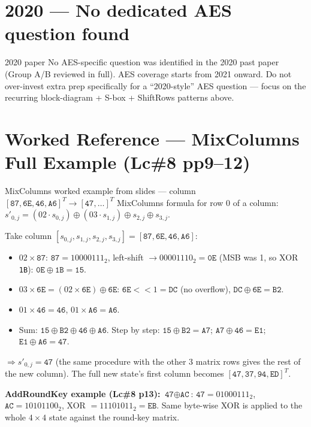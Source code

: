 \documentclass[12pt,a4paper]{article}
\begin{document}
\section*{2020 --- No dedicated AES question found}
\begin{warnbox}{2020 paper}
No AES-specific question was identified in the 2020 past paper (Group A/B reviewed in full). AES coverage starts from 2021 onward. Do not over-invest extra prep specifically for a ``2020-style'' AES question --- focus on the recurring block-diagram + S-box + ShiftRows patterns above.
\end{warnbox}

\section*{Worked Reference --- MixColumns Full Example (Lc\#8 pp9--12)}

\begin{algobox}{MixColumns worked example from slides --- column $[\texttt{87},\texttt{6E},\texttt{46},\texttt{A6}]^T \to [\texttt{47},\ldots]^T$}
MixColumns formula for row 0 of a column: $s'_{0,j}=(02\cdot s_{0,j})\oplus(03\cdot s_{1,j})\oplus s_{2,j}\oplus s_{3,j}$.

Take column $[s_{0,j},s_{1,j},s_{2,j},s_{3,j}]=[\texttt{87},\texttt{6E},\texttt{46},\texttt{A6}]$:
\begin{itemize}[noitemsep]
  \item $02\times\texttt{87}$: $\texttt{87}=10000111_2$, left-shift $\to 00001110_2=\texttt{0E}$ (MSB was 1, so XOR \texttt{1B}): $\texttt{0E}\oplus\texttt{1B}=\texttt{15}$.
  \item $03\times\texttt{6E} = (02\times\texttt{6E})\oplus\texttt{6E}$: $\texttt{6E}<<1=\texttt{DC}$ (no overflow), $\texttt{DC}\oplus\texttt{6E}=\texttt{B2}$.
  \item $01\times\texttt{46}=\texttt{46}$, \quad $01\times\texttt{A6}=\texttt{A6}$.
  \item Sum: $\texttt{15}\oplus\texttt{B2}\oplus\texttt{46}\oplus\texttt{A6}$. Step by step: $\texttt{15}\oplus\texttt{B2}=\texttt{A7}$; $\texttt{A7}\oplus\texttt{46}=\texttt{E1}$; $\texttt{E1}\oplus\texttt{A6}=\boxed{\texttt{47}}$.
\end{itemize}
$\Rightarrow s'_{0,j}=\texttt{47}$ (the same procedure with the other 3 matrix rows gives the rest of the new column). The full new state's first column becomes $[\texttt{47},\texttt{37},\texttt{94},\texttt{ED}]^T$.

\textbf{AddRoundKey example (Lc\#8 p13):} $\texttt{47}\oplus\texttt{AC}$: $\texttt{47}=01000111_2$, $\texttt{AC}=10101100_2$, XOR $=11101011_2=\texttt{EB}$. Same byte-wise XOR is applied to the whole $4\times4$ state against the round-key matrix.
\end{algobox}
\end{document}
